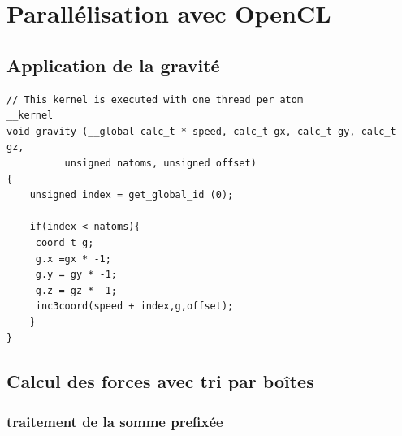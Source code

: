 \documentclass[a4paper,11pt]{report}
\begin{document}
\section{Parallélisation avec \textbf{OpenCL}}
\subsection{Application de la gravité}


\begin{lstlisting}[style=CStyle]
// This kernel is executed with one thread per atom
__kernel
void gravity (__global calc_t * speed, calc_t gx, calc_t gy, calc_t gz,
	      unsigned natoms, unsigned offset)
{
    unsigned index = get_global_id (0);

    if(index < natoms){
     coord_t g;
     g.x =gx * -1;
     g.y = gy * -1;
     g.z = gz * -1;
     inc3coord(speed + index,g,offset);
    }
}
\end{lstlisting}

\subsection{Calcul des forces avec tri par boîtes}
\subsubsection{traitement de la somme prefixée}
\end{document}
